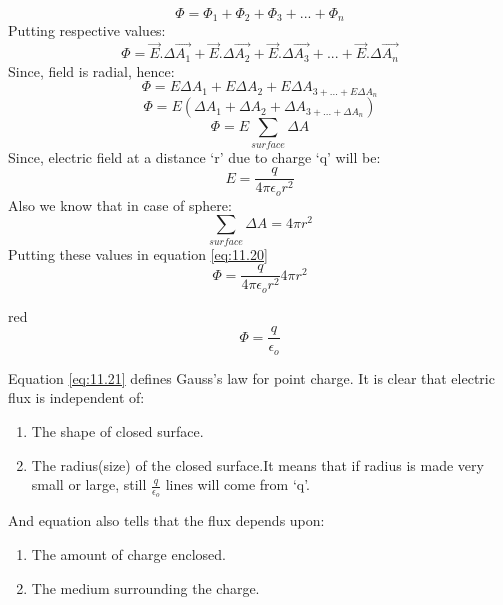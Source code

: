 \begin{equation}
  \Phi =  \Phi_{1}+ \Phi_{2}+ \Phi_{3}+...+ \Phi_{n} \nonumber
\end{equation}
Putting respective values:
\begin{equation}
  \Phi = \vec{E}.\Delta \vec{A_{1}}+\vec{E}.\Delta \vec{A_{2}} +\vec{E}.\Delta \vec{A_{3}}+...+\vec{E}.\Delta \vec{A_{n}} \nonumber
\end{equation}
Since, field is radial, hence:
\begin{equation}
  \Phi = E\Delta A_{1} + E\Delta A_{2} + E\Delta A_{3+...+E\Delta A_{n}} \nonumber
\end{equation}
\begin{equation}
  \Phi = E(\Delta A_{1} + \Delta A_{2} + \Delta A_{3+...+\Delta A_{n}}) \nonumber
\end{equation}
\begin{equation}\label{eq:11.20}
  \Phi = E\sum_{surface} \Delta A 
\end{equation}
Since, electric field at a distance ‘r’ due to charge ‘q’ will be:
\begin{equation}
  E = \frac{q}{4\pi\epsilon_{o}r^{2}} \nonumber
\end{equation}
Also we know that in case of sphere:
\begin{equation}
  \sum_{surface} \Delta A = 4\pi r^{2} \nonumber
\end{equation}
Putting these values in equation \ref{eq:11.20}
\begin{equation}
  \Phi = \frac{q}{4\pi\epsilon_{o}r^{2}} 4\pi r^{2} \nonumber
\end{equation}
\begin{mybox}{red}{}
\begin{equation}\label{eq:11.21}
  \Phi = \frac{q}{\epsilon_{o}}
\end{equation}
\end{mybox}
Equation \ref{eq:11.21} defines Gauss’s law for point charge. It is clear that electric flux is independent of:
\begin{enumerate}[label=(\roman*)] 
\item The shape of closed surface.
\item The radius(size) of the closed surface.It means that if radius
is made very small or large, still $\frac{q}{\epsilon_{o}}$ lines will come from ‘q’.
\end{enumerate}
And equation also tells that the flux depends upon:
\begin{enumerate}[label=(\roman*)]
\item The amount of charge enclosed.
\item The medium surrounding the charge.
\end{enumerate}
